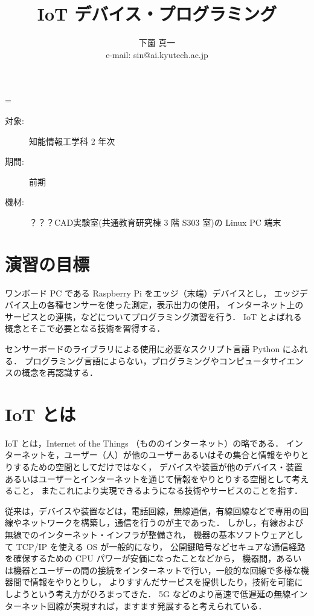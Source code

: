 \documentclass[11pt,a4,epsf]{report}
\title{{\bf IoT デバイス・プログラミング}}
\author{下薗 真一\\
e-mail: {\sf sin@ai.kyutech.ac.jp}\\
}
\def\linesparpage#1{\baselineskip=\textheight\divide\baselineskip#1}
\begin{document}
\linesparpage{36}
\maketitle

\medskip

\begin{description}
\item[対象:] 知能情報工学科 2 年次
\item[期間:] 前期
\item[機材:] ？？？CAD実験室(共通教育研究棟 3 階 S303 室)の Linux PC 端末%
\end{description}

\medskip

\section{演習の目標}

ワンボード PC である Raspberry Pi をエッジ（末端）デバイスとし，
エッジデバイス上の各種センサーを使った測定，表示出力の使用，
インターネット上のサービスとの連携，などについてプログラミング演習を行う．
IoT とよばれる概念とそこで必要となる技術を習得する．

センサーボードのライブラリによる使用に必要なスクリプト言語 Python にふれる．
プログラミング言語によらない，プログラミングやコンピュータサイエンスの概念を再認識する．

\section{IoT とは}

IoT とは，Internet of the Things （もののインターネット）の略である．
インターネットを，ユーザー（人）が他のユーザーあるいはその集合と情報をやりとりするための空間としてだけではなく，
デバイスや装置が他のデバイス・装置あるいはユーザーとインターネットを通じて情報をやりとりする空間として考えること，
またこれにより実現できるようになる技術やサービスのことを指す．

従来は，デバイスや装置などは，電話回線，無線通信，有線回線などで専用の回線やネットワークを構築し，通信を行うのが主であった．
しかし，有線および無線でのインターネット・インフラが整備され，
機器の基本ソフトウェアとして TCP/IP を使える OS が一般的になり，
公開鍵暗号などセキュアな通信経路を確保するための CPU パワーが安価になったことなどから，
機器間，あるいは機器とユーザーの間の接続をインターネットで行い，一般的な回線で多様な機器間で情報をやりとりし，
よりすすんだサービスを提供したり，技術を可能にしようという考え方がひろまってきた．
5G などのより高速で低遅延の無線インターネット回線が実現すれば，ますます発展すると考えられている．
\end{document}
